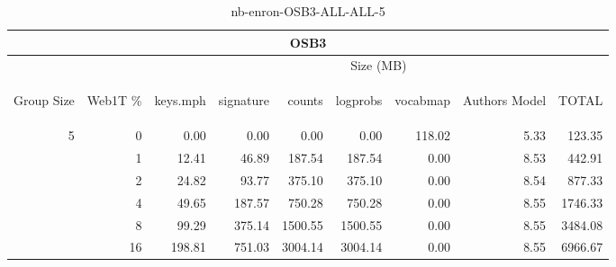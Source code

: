 \begin{center}
\begin{table}[htbp] 
 \begin{center}
\begin{tabular}{ | r | r | r | r | r | r | r | r | r |}
\hline
\multicolumn{9}{|c|}{OSB3}\\
\hline
 & & \multicolumn{7}{|c|}{Size (MB)}\\ \cline{3-9}
\begin{sideways}Group Size\end{sideways} & \begin{sideways}Web1T \% \end{sideways} & \begin{sideways}keys.mph\end{sideways} & \begin{sideways}signature\end{sideways} & \begin{sideways}counts\end{sideways} & \begin{sideways}logprobs\end{sideways} & \begin{sideways}vocabmap\end{sideways} & \begin{sideways}Authors Model \end{sideways} & \begin{sideways}TOTAL\end{sideways}\\
\hline
\multirow{5}{*}{5}
 & 0 & 0.00 & 0.00 & 0.00 & 0.00 & 118.02 & 5.33 & 123.35\\ \cline{2-9}
 & 1 & 12.41 & 46.89 & 187.54 & 187.54 & 0.00 & 8.53 & 442.91\\ \cline{2-9}
 & 2 & 24.82 & 93.77 & 375.10 & 375.10 & 0.00 & 8.54 & 877.33\\ \cline{2-9}
 & 4 & 49.65 & 187.57 & 750.28 & 750.28 & 0.00 & 8.55 & 1746.33\\ \cline{2-9}
 & 8 & 99.29 & 375.14 & 1500.55 & 1500.55 & 0.00 & 8.55 & 3484.08\\ \cline{2-9}
 & 16 & 198.81 & 751.03 & 3004.14 & 3004.14 & 0.00 & 8.55 & 6966.67\\ \cline{2-9}
\hline
\end{tabular}
\caption{nb-enron-OSB3-ALL-ALL-5}
\label{table:nb-enron-OSB3-ALL-ALL-5}
\end{center}
 \end{table}
\end{center}

